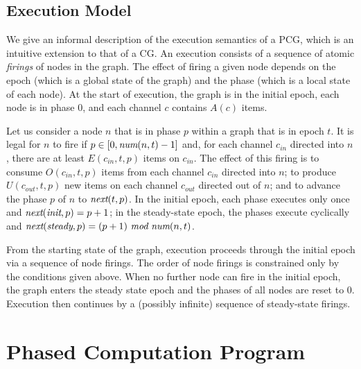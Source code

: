 \subsection{Execution Model}

We give an informal description of the execution semantics of a PCG,
which is an intuitive extension to that of a CG.  An execution
consists of a sequence of atomic {\it firings} of nodes in the graph.
The effect of firing a given node depends on the epoch (which is a
global state of the graph) and the phase (which is a local state of
each node). At the start of execution, the graph is in the initial
epoch, each node is in phase 0, and each channel $c$ contains $A(c)$
items.

Let us consider a node $n$ that is in phase $p$ within a graph that is
in epoch $t$.  It is legal for $n$ to fire if $p \in [0, \mbox{\it num}(n,
t)-1]$ and, for each channel $c_{in}$ directed into $n$, there are at
least $E(c_{in}, t, p)$ items on $c_{in}$.  The effect of this firing
is to consume $O(c_{in}, t, p)$ items from each channel $c_{in}$
directed into $n$; to produce $U(c_{out}, t, p)$ new items on each
channel $c_{out}$ directed out of $n$; and to advance the phase $p$ of
$n$ to $\mbox{\it next}(t, p)$.  In the initial epoch, each phase executes
only once and $\mbox{\it next}(\mbox{\it init}, p) = p + 1$; in the
steady-state epoch, the phases execute cyclically and
$\mbox{\it next}(\mbox{\it steady}, p) = (p + 1)~\mbox{\it mod}~\mbox{\it num}(n, t)$.

From the starting state of the graph, execution proceeds through the
initial epoch via a sequence of node firings.  The order of node
firings is constrained only by the conditions given above.  When no
further node can fire in the initial epoch, the graph enters the
steady state epoch and the phases of all nodes are reset to 0.
Execution then continues by a (possibly infinite) sequence of
steady-state firings.

\section{Phased Computation Program}

